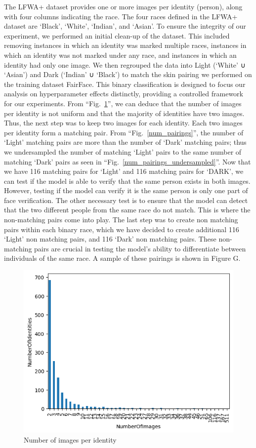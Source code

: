 \documentclass[conference]{IEEEtran}
\begin{document}
The LFWA+ dataset provides one or more images per identity (person), along with four columns indicating the race. The four races defined in the LFWA+ dataset are ‘Black’, ‘White’, ‘Indian’, and ‘Asian’. To ensure the integrity of our experiment, we performed an initial clean-up of the dataset. This included removing instances in which an identity was marked multiple races, instances in which an identity was not marked under any race, and instances in which an identity had only one image. We then regrouped the data into Light (‘White’ ∪ ‘Asian’) and Dark (‘Indian’ ∪ ‘Black’) to match the skin pairing we performed on the training dataset FairFace. This binary classification is designed to focus our analysis on hyperparameter effects distinctly, providing a controlled framework for our experiments.  From ``Fig.~\ref{num_img_per_identity}'', we can deduce that the number of images per identity is not uniform and that the majority of identities have two images. Thus, the next step was to keep two images for each identity. Each two images per identity form a matching pair. From ``Fig.~\ref{num_pairings}'', the number of ‘Light’ matching pairs are more than the number of ‘Dark’ matching pairs; thus we undersampled the number of matching ‘Light’ pairs to the same number of matching  ‘Dark’ pairs as seen in ``Fig.~\ref{num_pairings_undersampled}''.
Now that we have 116 matching pairs for ‘Light’ and 116 matching pairs for ‘DARK’, we can test if the model is able to verify that the same person exists in both images. However, testing if the model can verify it is the same person is only one part of face verification. The other necessary test is to ensure that the model can detect that the two different people from the same race do not match. This is where the non-matching pairs come into play. The last step was to create non matching pairs within each binary race, which we have decided to create additional 116 ‘Light’ non matching pairs, and 116 ‘Dark’ non matching pairs.  These non-matching pairs are crucial in testing the model's ability to differentiate between individuals of the same race. A sample of these pairings is shown in Figure G.

\begin{figure}[hbt!]
    \centering
    \includegraphics[height=0.5\linewidth]{latex/images/DistributionOfNumberOfImages.png}
    \caption{Number of images per identity}
    \label{num_img_per_identity}
\end{figure}
\end{document}
